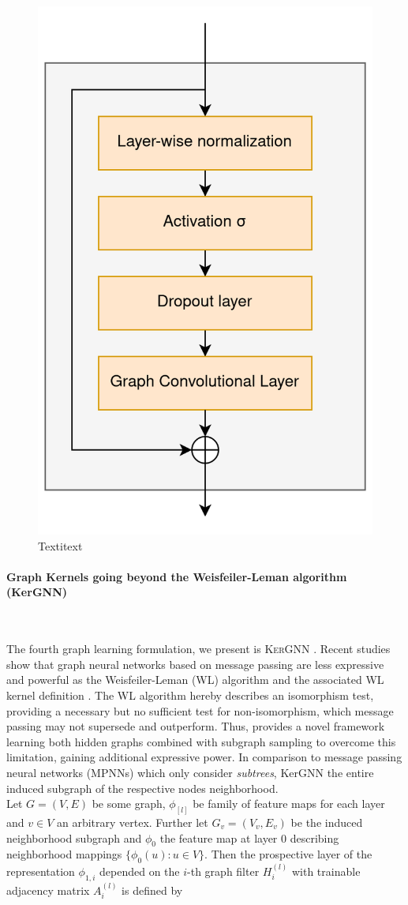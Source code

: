 \documentclass[]{article}
\renewcommand{\cite}{\citep}
\begin{document}
\begin{figure}
	\centering
	\includegraphics[width=.3\textwidth]{figures/GCN_residual_block.png}
	\caption{Textitext}
	\label{fig:ResGraphBlock}
\end{figure}

\paragraph{Graph Kernels going beyond the Weisfeiler-Leman algorithm (KerGNN)}\mbox{}\\
\label{sec:KerGNN}

The fourth graph learning formulation, we present is \textsc{KerGNN} \citet{feng2022kergnns}. Recent studies \cite{xu2018powerful, morris2019weisfeiler} show that graph neural networks based on message passing are less expressive and powerful as the Weisfeiler-Leman (WL) algorithm \cite{leman1968reduction} and the associated WL kernel definition \cite{shervashidze2009efficient}. The WL algorithm hereby describes an isomorphism test, providing a necessary but no sufficient test for non-isomorphism, which message passing may not supersede and outperform. Thus, \citet{feng2022kergnns} provides a novel framework learning both hidden graphs combined with subgraph sampling to overcome this limitation, gaining additional expressive power. In comparison to message passing neural networks (MPNNs) which only consider \textit{subtrees}, KerGNN the entire induced subgraph of the respective nodes neighborhood. \\

Let $G=(V,E)$ be some graph, $\phi_{[l]}$ be family of feature maps for each layer and $v\in V$ an arbitrary vertex. Further let $G_v=(V_v, E_v)$ be the induced neighborhood subgraph and $\phi_0$ the feature map at layer $0$ describing neighborhood mappings $\{ \phi_0(u):u\in V \}$. Then the prospective layer of the  representation $\phi_{1,i}$ depended on the $i$-th graph filter $H_i^{(l)}$ with trainable adjacency matrix $A_i^{(l)}$ is defined by
\end{document}
